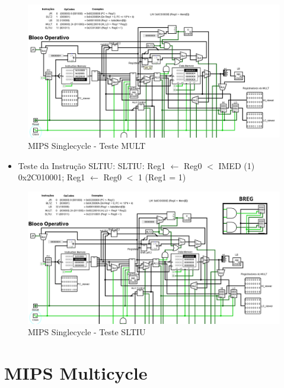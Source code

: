 \documentclass{report}
\let\oldsection\section
\renewcommand\section{\clearpage\oldsection}
\begin{document}
        \begin{figure}[h!]
            \centering
            \includegraphics[width=\linewidth]{images/prints/Monocycle/Teste MULT.png}
            \caption{\label{print:singlecycle_test_MULT} MIPS Singlecycle - Teste MULT}
        \end{figure}

        \clearpage
        \begin{itemize}
            \item Teste da Instrução SLTIU:
                \subitem SLTIU: Reg1 $\leftarrow$ Reg0 $<$ IMED (1)
                \subitem 0x2C010001; Reg1 $\leftarrow$ Reg0 $<$ 1 (Reg1 = 1)
        \end{itemize}

        \begin{figure}[h!]
            \centering
            \includegraphics[width=\linewidth]{images/prints/Monocycle/Teste SLTIU.png}
            \caption{\label{print:singlecycle_test_SLTIU} MIPS Singlecycle - Teste SLTIU}
        \end{figure}

    \section{MIPS Multicycle}
\end{document}
